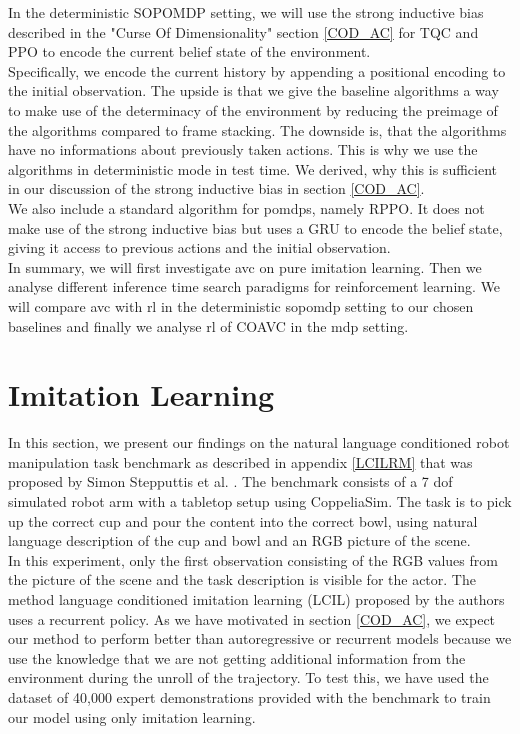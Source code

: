 In the deterministic SOPOMDP setting, we will use the strong inductive bias described in the "Curse Of Dimensionality" 
section \ref{COD_AC} for TQC and PPO to encode the current belief state of the environment. \\
Specifically, we encode the current history by appending a positional encoding to the initial observation. The upside is that we give 
the baseline algorithms a way to make use of the determinacy of the environment by reducing the preimage of the algorithms compared to 
frame stacking. The downside is, that the algorithms have no informations about previously taken actions. This is why we use the 
algorithms in deterministic mode in test time. We derived, why this is sufficient in our discussion of the strong inductive bias in 
section \ref{COD_AC}.\\

We also include a standard algorithm for \ac{pomdp}s, namely RPPO. It does not make use of the strong inductive bias but uses a GRU 
to encode the belief state, giving it access to previous actions and the initial observation.\\


In summary, we will first investigate \ac{avc} on pure imitation learning. Then we analyse different inference time search 
paradigms for reinforcement learning. We will compare \ac{avc} with \ac{rl} in the deterministic \ac{sopomdp} setting to our chosen baselines and finally we analyse 
\ac{rl} of COAVC in the \ac{mdp} setting.


\section{Imitation Learning}
\label{sec:exp_imi_lr}
In this section, we present our findings on the natural language conditioned robot manipulation task benchmark as described in appendix \ref{LCILRM} that was proposed by 
Simon Stepputtis et al. \cite{stepputtis2020languageconditioned}. The benchmark consists of a 7 dof simulated robot arm with a 
tabletop setup using CoppeliaSim. The task is to pick 
up the correct cup and pour the content into the correct bowl, using natural language description of the cup and bowl and an RGB 
picture of the scene.\\

In this experiment, only the first observation consisting of the RGB values from the picture of the 
scene and the task description is visible for the actor. The method language conditioned imitation learning (LCIL)
proposed by the authors uses a recurrent policy. As we have motivated in section \ref{COD_AC}, we expect our method to perform better than autoregressive or recurrent 
models because we use the knowledge that we are not getting additional information from the environment during the unroll of the trajectory. 
To test this, we have used the dataset of 40,000 expert demonstrations provided with the benchmark to train our model using only imitation learning.\\

